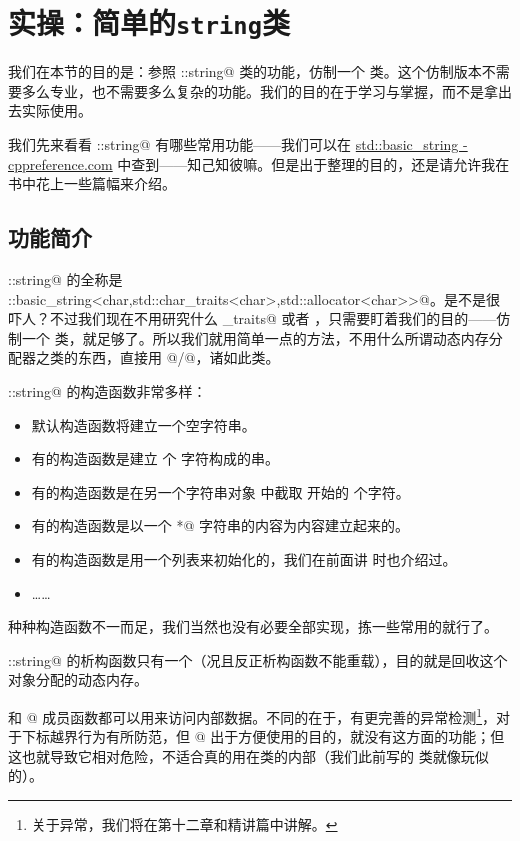 \section{实操：简单的\texttt{string}类}
我们在本节的目的是：参照 \lstinline@std::string@ 类的功能，仿制一个 \lstinline@string@ 类。这个仿制版本不需要多么专业，也不需要多么复杂的功能。我们的目的在于学习与掌握，而不是拿出去实际使用。\par
我们先来看看 \lstinline@std::string@ 有哪些常用功能——我们可以在 \href{https://en.cppreference.com/w/cpp/string/basic\_string}{std::basic\_string - cppreference.com} 中查到——知己知彼嘛。但是出于整理的目的，还是请允许我在书中花上一些篇幅来介绍。\par
\subsection*{功能简介}
\lstinline@std::string@ 的全称是 \lstinline@std::basic_string<char,std::char_traits<char>,std::allocator<char>>@。是不是很吓人？不过我们现在不用研究什么 \lstinline@char_traits@ 或者 \lstinline@allocator@，只需要盯着我们的目的——仿制一个 \lstinline@string@ 类，就足够了。所以我们就用简单一点的方法，不用什么所谓动态内存分配器之类的东西，直接用 \lstinline@new[]@/\lstinline@delete[]@，诸如此类。\par
\lstinline@std::string@ 的构造函数非常多样：
\begin{itemize}
    \item 默认构造函数将建立一个空字符串。
    \item 有的构造函数是建立 \lstinline@count@ 个 \lstinline@ch@ 字符构成的串。
    \item 有的构造函数是在另一个字符串对象 \lstinline@other@ 中截取 \lstinline@pos@ 开始的 \lstinline@count@ 个字符。
    \item 有的构造函数是以一个 \lstinline@char*@ 字符串的内容为内容建立起来的。
    \item 有的构造函数是用一个列表来初始化的，我们在前面讲 \lstinline@valarri@ 时也介绍过。
    \item ……
\end{itemize}
种种构造函数不一而足，我们当然也没有必要全部实现，拣一些常用的就行了。\par
\lstinline@std::string@ 的析构函数只有一个（况且反正析构函数不能重载），目的就是回收这个对象分配的动态内存。\par
\lstinline@at@ 和 \lstinline@operator[]@ 成员函数都可以用来访问内部数据。不同的在于，\lstinline@at@ 有更完善的异常检测\footnote{关于异常，我们将在第十二章和精讲篇中讲解。}，对于下标越界行为有所防范，但 \lstinline@operator[]@ 出于方便使用的目的，就没有这方面的功能；但这也就导致它相对危险，不适合真的用在类的内部（我们此前写的 \lstinline@valarri@ 类就像玩似的）。\par
